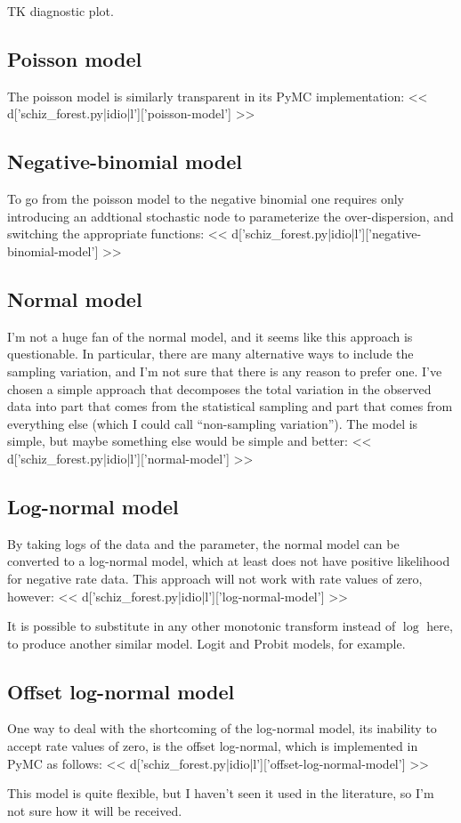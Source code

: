 TK diagnostic plot.

\subsection{Poisson model}
The poisson model is similarly transparent in its PyMC implementation:
<< d['schiz_forest.py|idio|l']['poisson-model'] >>

\subsection{Negative-binomial model}
To go from the poisson model to the negative binomial one requires
only introducing an addtional stochastic node to parameterize the
over-dispersion, and switching the appropriate functions:
<< d['schiz_forest.py|idio|l']['negative-binomial-model'] >>

\subsection{Normal model}
I'm not a huge fan of the normal model, and it seems like this
approach is questionable.  In particular, there are many alternative
ways to include the sampling variation, and I'm not sure that there is
any reason to prefer one.  I've chosen a simple approach that
decomposes the total variation in the observed data into part that
comes from the statistical sampling and part that comes from
everything else (which I could call ``non-sampling variation'').  The
model is simple, but maybe something else would be simple and better:
<< d['schiz_forest.py|idio|l']['normal-model'] >>



\subsection{Log-normal model}
By taking logs of the data and the parameter, the normal model can be
converted to a log-normal model, which at least does not have positive
likelihood for negative rate data.  This approach will not work with
rate values of zero, however:
<< d['schiz_forest.py|idio|l']['log-normal-model'] >>

It is possible to substitute in any other monotonic transform instead
of $\log$ here, to produce another similar model.  Logit and Probit
models, for example.



\subsection{Offset log-normal model}
One way to deal with the shortcoming of the log-normal model, its
inability to accept rate values of zero, is the offset log-normal,
which is implemented in PyMC as follows:
<< d['schiz_forest.py|idio|l']['offset-log-normal-model'] >>

This model is quite flexible, but I haven't seen it used in the
literature, so I'm not sure how it will be received.

